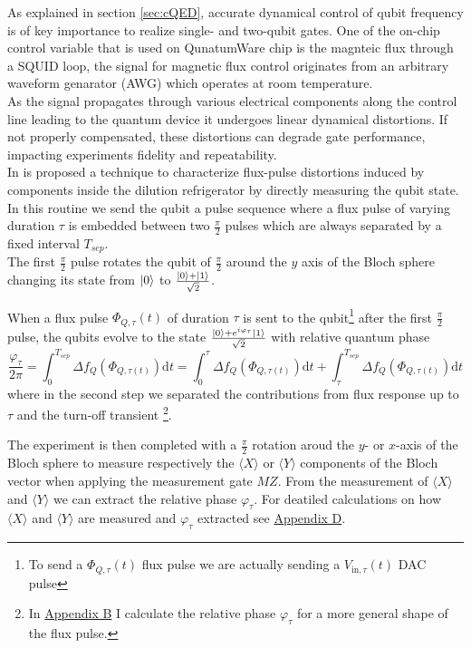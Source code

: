As explained in section \ref{sec:cQED}, accurate dynamical control of qubit frequency is of key importance to realize single- and two-qubit gates.
One of the on-chip control variable that is used on QunatumWare chip is the magnteic flux through a SQUID loop, the signal for magnetic flux control originates from an arbitrary waveform genarator (AWG) which operates at room temperature.\\
As the signal propagates through various electrical components along the control line leading to the quantum device it undergoes linear dynamical distortions. 
If not properly compensated, these distortions can degrade gate performance, impacting experiments fidelity and repeatability.\\

In \cite{rol_time-domain_2020} is proposed a technique to characterize flux-pulse distortions induced by components inside the dilution refrigerator by directly measuring the qubit state.
In this routine we send the qubit a pulse sequence where a flux pulse of varying duration $\tau$ is embedded between two $\frac{\pi}{2}$ pulses which are always separated by a fixed interval $T_{sep}$.\\
The first $\frac{\pi}{2}$ pulse rotates the qubit of $\frac{\pi}{2}$ around the $y$ axis of the Bloch sphere changing its state from $\ket{0}$ to $\frac{\ket{0}+\ket{1}}{\sqrt{2}}$.

When a flux pulse $\Phi_{Q,\tau}(t)$ of duration $\tau$ is sent to the qubit\footnote{To send a $\Phi_{Q,\tau}(t)$ flux pulse we are actually sending a $V_{\text{in},\tau}(t)$ DAC pulse} after the first $\frac{\pi}{2}$ pulse, the qubits evolve to the state $\frac{\ket{0}+e^{i\varphi_\tau}\ket{1}}{\sqrt{2}}$ with relative quantum phase 
\begin{equation}\label{eq:phi}
    \frac{\varphi_{\tau}}{2\pi} = \int_{0}^{T_{sep}} \Delta f_Q (\Phi_{Q,\tau(t)})\text{d}t = \int_{0}^{\tau} \Delta f_Q (\Phi_{Q,\tau(t)})\text{d}t + \int_{\tau}^{T_{sep}} \Delta f_Q (\Phi_{Q,\tau(t)})\text{d}t
\end{equation}
where in the second step we separated the contributions from flux response up to $\tau$ and the turn-off transient \footnote{In \hyperref[app:AppendixB]{Appendix B} I calculate the relative phase $\varphi_{\tau}$ for a more general shape of the flux pulse.}. 

The experiment is then completed with a $\frac{\pi}{2}$ rotation aroud the $y$- or $x$-axis of the Bloch sphere to measure respectively the $\langle X \rangle$ or $\langle Y \rangle$ components of the Bloch vector when applying the measurement gate $MZ$. 
From the measurement of $\langle X \rangle$ and $\langle Y \rangle$ we can extract the relative phase $\varphi_{\tau}$.
For deatiled calculations on how $\langle X \rangle$ and $\langle Y \rangle$ are measured and $\varphi_{\tau}$ extracted see \hyperref[app:AppendixD]{Appendix D}. \\ 

